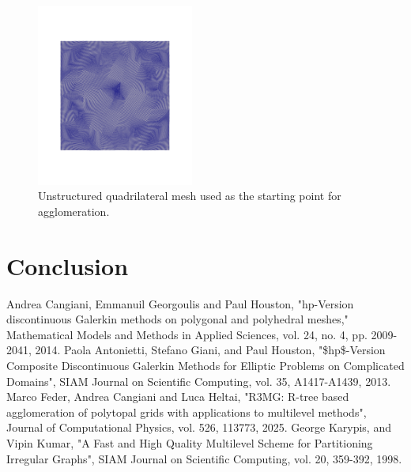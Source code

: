 \documentclass[a4paper,12pt]{article}
\begin{document}
\begin{figure}[htbp]
    \centering
    \includegraphics[width=0.46\textwidth]{unstructured_square.pdf}
    \caption{Unstructured quadrilateral mesh used as the starting point for agglomeration.}
    \label{fig:unstructured_mesh}
\end{figure}



\newpage
\section{{Conclusion}} \label{sec:conclusion}



\begin{thebibliography}{10}
    Andrea Cangiani, Emmanuil Georgoulis and Paul Houston, "hp-Version discontinuous Galerkin methods on polygonal and polyhedral meshes," Mathematical Models and Methods in Applied Sciences, vol. 24, no. 4, pp. 2009-2041, 2014.
    Paola Antonietti, Stefano Giani, and Paul Houston, "\$hp\$-Version Composite Discontinuous Galerkin Methods for Elliptic Problems on Complicated Domains", SIAM Journal on Scientific Computing, vol. 35, A1417-A1439, 2013.
    Marco Feder, Andrea Cangiani and Luca Heltai, "R3MG: R-tree based agglomeration of polytopal grids with applications to multilevel methods", Journal of Computational Physics, vol. 526, 113773, 2025.
    George Karypis, and Vipin Kumar, "A Fast and High Quality Multilevel Scheme for Partitioning Irregular Graphs", SIAM Journal on Scientific Computing, vol. 20, 359-392, 1998.
\end{thebibliography}









\label{MyLastPage}
\end{document}
